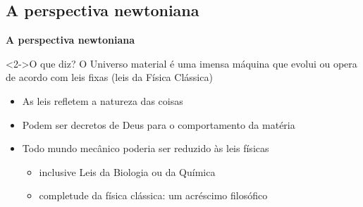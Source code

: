 \subsection{A perspectiva newtoniana}
\begin{frame}{\textbf{A perspectiva newtoniana}}
  \centering
  \begin{minipage}{\textwidth}
    \begin{exampleblock}<2->{O que diz?}
    O Universo material é uma imensa máquina que evolui ou opera de acordo com
    \textcolor{NordYellow}{leis fixas} (leis da Física Clássica)
    \end{exampleblock}
  \end{minipage}
	
  \vspace{0.5cm}
  \begin{itemize}
    \item<3->[$\bullet$] As leis refletem a natureza das coisas
    \item<4->[$\bullet$] Podem ser decretos de Deus para o comportamento da 
                         matéria
    \item<5->[$\bullet$] Todo mundo mecânico poderia ser reduzido às leis 
                         físicas
     \begin{itemize}
       \item<6-> inclusive Leis da Biologia ou da Química
       \item<7-> \textcolor{NordRed}{completude da física clássica}: um 
                                     acréscimo filosófico
     \end{itemize}
  \end{itemize}
\end{frame}

